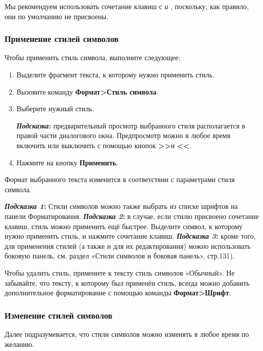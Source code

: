 \documentclass[a4paper,10pt]{article}
\begin{document}
Мы рекомендуем использовать сочетание клавиш с  \textit{и} , поскольку, как правило, они по умолчанию не присвоены.

\subsubsection{Применение стилей символов}
Чтобы применить стиль символа, выполните следующее:
\begin{enumerate}
 \item Выделите фрагмент текста, к которому нужно применить стиль.
 \item Вызовите команду \textbf{Формат>Стиль символа}.
 \item Выберите нужный стиль.
 \begin{mdframed}[backgroundcolor=blue!10]
\textbf{\textit{Подсказка}:} предварительный просмотр выбранного стиля располагается в правой части диалогового окна. Предпросмотр можно в любое время включить или выключить с помощью кнопок \textbf{>>}и \textbf{<<}.
\end{mdframed}
\item Нажмите на кнопку \textbf{Применить}.
\end{enumerate}

Формат выбранного текста изменится в соответствии с параметрами стиля символа.

\begin{mdframed}[backgroundcolor=blue!10]
\textbf{\textit{Подсказка 1}:} Стили символов можно также выбрать из списке шрифтов на панели Форматирования.
\newline
\newline
\textbf{\textit{Подсказка 2}:} в случае, если стилю присвоено сочетание клавиш, стиль можно применить ещё быстрее. Выделите символ, к которому нужно применить стиль, и нажмите сочетание клавиш.
\newline
\newline
\textbf{\textit{Подсказка 3}:} кроме того, для применения стилей (а также и для их редактирования) можно использовать боковую панель, см. раздел «Стили символов и боковая панель», стр.131).
\end{mdframed}

Чтобы удалить стиль, примените к тексту стиль символов «Обычный». Не забывайте, что тексту, к которому был применён стиль, всегда можно добавить дополнительное форматирование с помощью команды \textbf{Формат>Шрифт}.

\subsubsection{Изменение стилей символов}
Далее подразумевается, что стили символов можно изменять в любое время по желанию.
\end{document}
